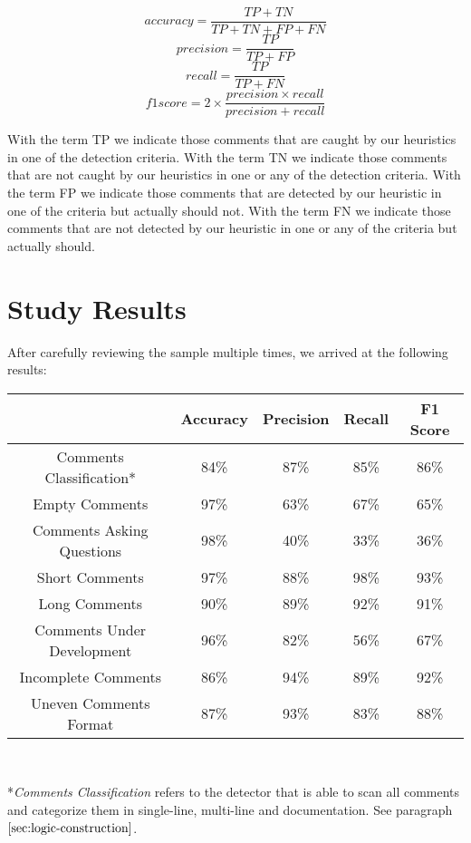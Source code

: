 \begin{equation*}
	accuracy = \frac{TP + TN}{TP + TN + FP + FN}		
\end{equation*}
\begin{equation*}
	precision = \frac{TP}{TP + FP}
\end{equation*}
\begin{equation*}
	recall = \frac{TP}{TP + FN}
\end{equation*}
\begin{equation*}
	f1score = 2 \times \frac{precision \times recall}{precision + recall}
\end{equation*}

\noindent With the term TP we indicate those comments that are caught by our heuristics in one of the detection criteria. With the term TN we indicate those comments that are not caught by our heuristics in one or any of the detection criteria. With the term FP we indicate those comments that are detected by our heuristic in one of the criteria but actually should not. With the term FN we indicate those comments that are not detected by our heuristic in one or any of the criteria but actually should.

\section{Study Results}
After carefully reviewing the sample multiple times, we arrived at the following results:

\begin{center}
	\begin{tabular}{|c|c|c|c|c|}
		\hline
		& \textbf{Accuracy} & \textbf{Precision} & \textbf{Recall} & \textbf{F1 Score} \\
		\hline Comments Classification*    & 84\%     & 87\%      & 85\%   & 86\%    \\
		\hline Empty Comments             & 97\%     & 63\%      & 67\%   & 65\%    \\
		\hline Comments Asking Questions  & 98\%     & 40\%      & 33\%   & 36\%    \\
		\hline Short Comments             & 97\%     & 88\%      & 98\%   & 93\%    \\
		\hline Long Comments              & 90\%     & 89\%      & 92\%   & 91\%    \\
		\hline Comments Under Development & 96\%     & 82\%      & 56\%   & 67\%    \\
		\hline Incomplete Comments        & 86\%     & 94\%      & 89\%   & 92\%    \\
		\hline Uneven Comments Format     & 87\%     & 93\%      & 83\%   & 88\%   \\
		\hline
	\end{tabular}
	
	\textit{\\}
	
	*\textit{Comments Classification} refers to the detector that is able to scan all comments and categorize them in single-line, multi-line and documentation. See paragraph $\ref{sec:logic-construction}$.
\end{center}

